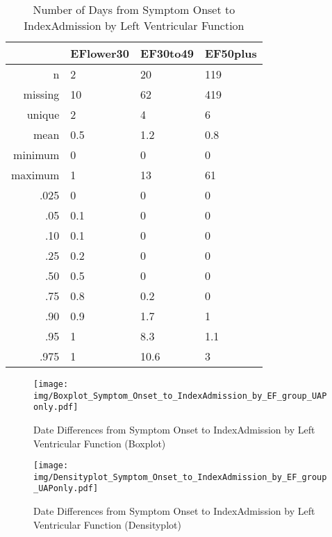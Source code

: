 \documentclass[a4paper]{report}
\begin{document}
\begin{itemize}
{%
\begin{table}[ht]
\centering
\begin{tabular}{rlll}
  \toprule
 & EFlower30 & EF30to49 & EF50plus \\ 
  \midrule
n & 2 & 20 & 119 \\ 
  missing & 10 & 62 & 419 \\ 
  unique & 2 & 4 & 6 \\ 
  mean & 0.5 & 1.2 & 0.8 \\ 
  minimum & 0 & 0 & 0 \\ 
  maximum & 1 & 13 & 61 \\ 
  .025 & 0 & 0 & 0 \\ 
  .05 & 0.1 & 0 & 0 \\ 
  .10 & 0.1 & 0 & 0 \\ 
  .25 & 0.2 & 0 & 0 \\ 
  .50 & 0.5 & 0 & 0 \\ 
  .75 & 0.8 & 0.2 & 0 \\ 
  .90 & 0.9 & 1.7 & 1 \\ 
  .95 & 1 & 8.3 & 1.1 \\ 
  .975 & 1 & 10.6 & 3 \\ 
   \bottomrule
\end{tabular}
\caption{Number of Days from Symptom Onset to IndexAdmission by Left Ventricular Function} 
\end{table}
\begin{figure}
  \centering
  \caption{Date Differences from Symptom Onset to IndexAdmission by Left Ventricular Function (Boxplot)}
  \label{Boxplot: Date Differences from Symptom Onset to IndexAdmission by Left Ventricular Function}
\texttt{[image: img/Boxplot\_Symptom\_Onset\_to\_IndexAdmission\_by\_EF\_group\_UAPonly.pdf]}\end{figure}


\begin{figure}
  \centering
  \caption{Date Differences from Symptom Onset to IndexAdmission by Left Ventricular Function (Densityplot)}
  \label{Density: Date Differences from Symptom Onset to IndexAdmission by Left Ventricular Function}
\texttt{[image: img/Densityplot\_Symptom\_Onset\_to\_IndexAdmission\_by\_EF\_group\_UAPonly.pdf]}\end{figure}


\clearpage

}
\end{itemize}
\end{document}
